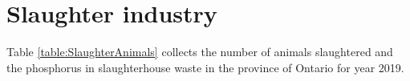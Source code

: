 \documentclass[authoryear]{elsarticle}
\begin{document}
%

\newpage
\section{Slaughter industry}
Table \ref{table:SlaughterAnimals} collects the number of animals slaughtered and the phosphorus in slaughterhouse waste in the province of Ontario for year 2019.
\end{document}

